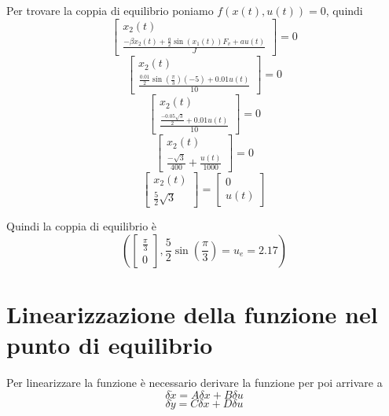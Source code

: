 \documentclass{article}
\begin{document}
Per trovare la coppia di equilibrio poniamo $f(x(t),u(t))=0$, quindi
\[\begin{bmatrix}
x_{2}(t)\\ \frac{ - \beta x_{2}(t) + \frac{a}{2}\sin{ (x_{1}(t)) } F_{v} + a u(t)} {J}
\end{bmatrix}=0\]
\[\begin{bmatrix}
x_{2}(t)\\ \frac{\frac{0.01}{2}\sin{(\frac{\pi}{3})} (-5)+0.01u(t)}{10}
\end{bmatrix}=0 \]
\[\begin{bmatrix}
x_{2}(t)\\
\frac{\frac{-0.05\sqrt{3}}{2}+0.01u(t)}{10}
\end{bmatrix}=0 \]
\[\begin{bmatrix}
x_{2}(t)\\
\frac{-\sqrt{3}}{400}+\frac{u(t)}{1000}
\end{bmatrix}=0 \]
\[\begin{bmatrix}
x_{2}(t)\\
\frac{5}{2}\sqrt{3}
\end{bmatrix}=\begin{bmatrix}0\\u(t)\end{bmatrix} \]

Quindi la coppia di equilibrio è \[\left(\begin{bmatrix}
\frac{\pi}{3}
\\
0
\end{bmatrix}
,\frac{5}{2}\sin{\left(\frac{\pi}{3}\right)}=u_e=2.17\right)\]

\section{Linearizzazione della funzione nel punto di equilibrio}
Per linearizzare la funzione è necessario derivare la funzione per poi arrivare a \[\delta \dot{x}=A \delta x+B\delta u\]\[\delta \dot{y}=C \delta x + D \delta u\]
\end{document}
